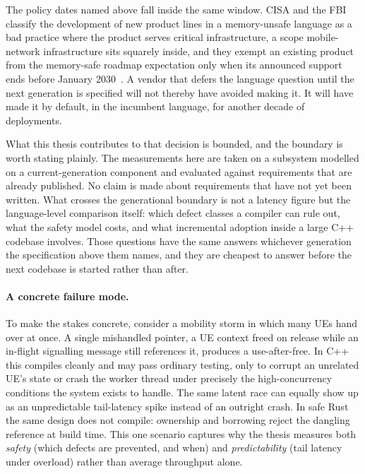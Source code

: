\documentclass[english,twoside,openright,a4paper,censored,csm,software-track-2020]{HYthesisML}
\begin{document}
The policy dates named above fall inside the same window. CISA and the FBI classify the
development of new product lines in a memory-unsafe language as a bad practice where the product
serves critical infrastructure, a scope mobile-network infrastructure sits squarely inside, and
they exempt an existing product from the memory-safe roadmap expectation only when its announced
support ends before January 2030~\cite{cisa2025badpractices}. A vendor that defers the language
question until the next generation is specified will not thereby have avoided making it. It will
have made it by default, in the incumbent language, for another decade of deployments.

What this thesis contributes to that decision is bounded, and the boundary is worth stating
plainly. The measurements here are taken on a subsystem modelled on a current-generation
component and evaluated against requirements that are already published. No claim is made about
requirements that have not yet been written. What crosses the generational boundary is not a
latency figure but the language-level comparison itself: which defect classes a compiler can rule
out, what the safety model costs, and what incremental adoption inside a large C++ codebase
involves. Those questions have the same answers whichever generation the specification above them
names, and they are cheapest to answer before the next codebase is started rather than after.

\paragraph{A concrete failure mode.}
To make the stakes concrete, consider a mobility storm in which many UEs hand over at once. A
single mishandled pointer, a UE context freed on release while an in-flight signalling message
still references it, produces a use-after-free. In C++ this compiles cleanly and may pass
ordinary testing, only to corrupt an unrelated UE's state or crash the worker thread under
precisely the high-concurrency conditions the system exists to handle. The same latent race
can equally show up as an unpredictable tail-latency spike instead of an outright crash. In
safe Rust the same design does not compile: ownership and borrowing reject the dangling
reference at build time. This one scenario captures why the thesis measures both
\emph{safety} (which defects are prevented, and when) and \emph{predictability} (tail
latency under overload) rather than average throughput alone.
\end{document}
